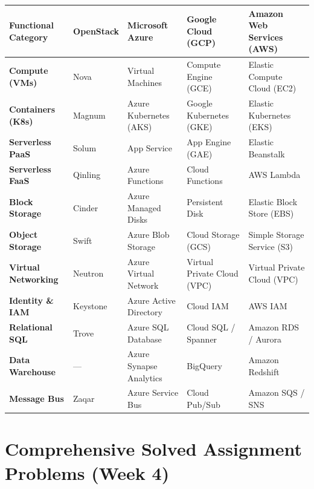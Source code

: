 \begin{center}
\begin{tabularx}{\textwidth}{>{\bfseries}l l l l l}
\toprule
Functional Category & OpenStack & Microsoft Azure & Google Cloud (GCP) & Amazon Web Services (AWS)\\
\midrule
Compute (VMs) & Nova & Virtual Machines & Compute Engine (GCE) & Elastic Compute Cloud (EC2)\\
Containers (K8s) & Magnum & Azure Kubernetes (AKS) & Google Kubernetes (GKE) & Elastic Kubernetes (EKS)\\
Serverless PaaS & Solum & App Service & App Engine (GAE) & Elastic Beanstalk\\
Serverless FaaS & Qinling & Azure Functions & Cloud Functions & AWS Lambda\\
Block Storage & Cinder & Azure Managed Disks & Persistent Disk & Elastic Block Store (EBS)\\
Object Storage & Swift & Azure Blob Storage & Cloud Storage (GCS) & Simple Storage Service (S3)\\
Virtual Networking & Neutron & Azure Virtual Network & Virtual Private Cloud (VPC) & Virtual Private Cloud (VPC)\\
Identity \& IAM & Keystone & Azure Active Directory & Cloud IAM & AWS IAM\\
Relational SQL & Trove & Azure SQL Database & Cloud SQL / Spanner & Amazon RDS / Aurora\\
Data Warehouse & --- & Azure Synapse Analytics & BigQuery & Amazon Redshift\\
Message Bus & Zaqar & Azure Service Bus & Cloud Pub/Sub & Amazon SQS / SNS\\
\bottomrule
\end{tabularx}
\end{center}

\section{Comprehensive Solved Assignment Problems (Week 4)}

